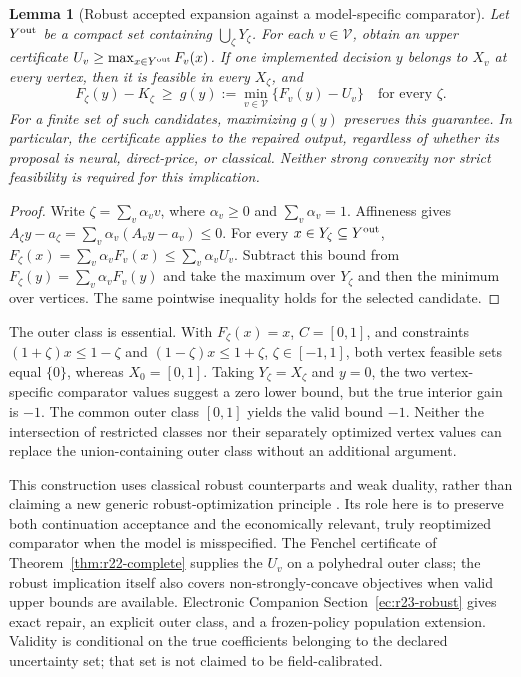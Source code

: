 \documentclass[11pt,letterpaper]{article}
\newtheorem{lemma}[theorem]{Lemma}
\theoremstyle{definition}
\newcommand{\1}{\mathbf 1}
\begin{document}
\begin{lemma}[Robust accepted expansion against a model-specific comparator]\label{thm:r23-robust}
Let $Y^{\rm out}$ be a compact set containing $\bigcup_\zeta Y_\zeta$. For each $v\in\mathcal V$, obtain an upper certificate $U_v\geq\max_{x\in Y^{\rm out}}F_v(x)$. If one implemented decision $y$ belongs to $X_v$ at every vertex, then it is feasible in every $X_\zeta$, and
\begin{equation}\label{eq:r23-gain}
 F_\zeta(y)-K_\zeta\ \geq\ g(y):=\min_{v\in\mathcal V}\{F_v(y)-U_v\}
 \quad\text{for every }\zeta.
\end{equation}
For a finite set of such candidates, maximizing $g(y)$ preserves this guarantee. In particular, the certificate applies to the repaired output, regardless of whether its proposal is neural, direct-price, or classical. Neither strong convexity nor strict feasibility is required for this implication.
\end{lemma}
\begin{proof}
Write $\zeta=\sum_v\alpha_v v$, where $\alpha_v\geq0$ and $\sum_v\alpha_v=1$. Affineness gives $A_\zeta y-a_\zeta=\sum_v\alpha_v(A_vy-a_v)\leq0$. For every $x\in Y_\zeta\subseteq Y^{\rm out}$,
$F_\zeta(x)=\sum_v\alpha_vF_v(x)\leq\sum_v\alpha_vU_v$.
Subtract this bound from $F_\zeta(y)=\sum_v\alpha_vF_v(y)$ and take the maximum over $Y_\zeta$ and then the minimum over vertices. The same pointwise inequality holds for the selected candidate.
\end{proof}

The outer class is essential. With $F_\zeta(x)=x$, $C=[0,1]$, and constraints $(1+\zeta)x\leq1-\zeta$ and $(1-\zeta)x\leq1+\zeta$, $\zeta\in[-1,1]$, both vertex feasible sets equal $\{0\}$, whereas $X_0=[0,1]$. Taking $Y_\zeta=X_\zeta$ and $y=0$, the two vertex-specific comparator values suggest a zero lower bound, but the true interior gain is $-1$. The common outer class $[0,1]$ yields the valid bound $-1$. Neither the intersection of restricted classes nor their separately optimized vertex values can replace the union-containing outer class without an additional argument.

This construction uses classical robust counterparts and weak duality, rather than claiming a new generic robust-optimization principle \citep{BenTalNemirovski2000,BertsimasSim2004}. Its role here is to preserve both continuation acceptance and the economically relevant, truly reoptimized comparator when the model is misspecified. The Fenchel certificate of Theorem~\ref{thm:r22-complete} supplies the $U_v$ on a polyhedral outer class; the robust implication itself also covers non-strongly-concave objectives when valid upper bounds are available. Electronic Companion Section~\ref{ec:r23-robust} gives exact repair, an explicit outer class, and a frozen-policy population extension. Validity is conditional on the true coefficients belonging to the declared uncertainty set; that set is not claimed to be field-calibrated.
\end{document}
